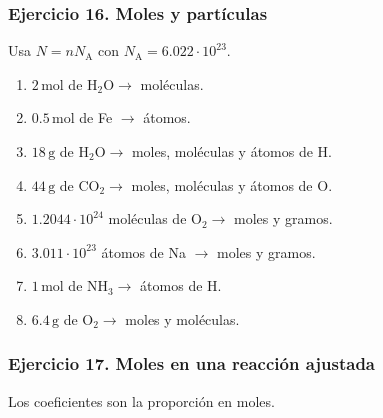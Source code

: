 \subsubsection*{Ejercicio 16. Moles y partículas}

Usa $N=nN_{\mathrm{A}}$ con $N_{\mathrm{A}}=6.022\cdot10^{23}$.

\begin{enumerate}
    \item[a)] $2\,\mathrm{mol}$ de $\mathrm{H_2O}\rightarrow$ moléculas.
    \item[b)] $0.5\,\mathrm{mol}$ de Fe $\rightarrow$ átomos.
    \item[c)] $18\,\mathrm{g}$ de $\mathrm{H_2O}\rightarrow$
    moles, moléculas y átomos de H.
    \item[d)] $44\,\mathrm{g}$ de $\mathrm{CO_2}\rightarrow$
    moles, moléculas y átomos de O.
    \item[e)] $1.2044\cdot10^{24}$ moléculas de $\mathrm{O_2}\rightarrow$
    moles y gramos.
    \item[f)] $3.011\cdot10^{23}$ átomos de Na $\rightarrow$
    moles y gramos.
    \item[g)] $1\,\mathrm{mol}$ de $\mathrm{NH_3}\rightarrow$ átomos de H.
    \item[h)] $6.4\,\mathrm{g}$ de $\mathrm{O_2}\rightarrow$
    moles y moléculas.
\end{enumerate}

\subsubsection*{Ejercicio 17. Moles en una reacción ajustada}

Los coeficientes son la proporción en moles.

